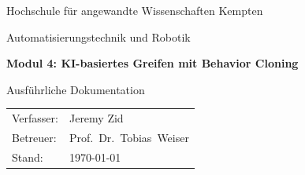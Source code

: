 \documentclass[
  a4paper,
  12pt,
  oneside,
  parskip=half,
  bibliography=totoc,
  listof=totoc,
  numbers=noenddot
]{scrreprt}
\newcommand{\doctitle}{Modul 4: KI-basiertes Greifen mit Behavior Cloning}
\newcommand{\docsubtitle}{Ausführliche Dokumentation}
\newcommand{\docauthor}{Jeremy Zid}
\newcommand{\thesiscourse}{Automatisierungstechnik und Robotik}
\newcommand{\thesissupervisor}{Prof.~Dr.~Tobias~Weiser}
\begin{document}
\begin{titlepage}
  \centering
  {\large Hochschule für angewandte Wissenschaften Kempten\par}
  \vspace{0.5cm}
  {\large \thesiscourse\par}
  \vspace{3cm}
  {\LARGE\bfseries \doctitle\par}
  \vspace{0.8cm}
  {\Large \docsubtitle\par}
  \vfill
  \begin{tabular}{ll}
    Verfasser: & \docauthor \\
    Betreuer:  & \thesissupervisor \\
    Stand:     & \today \\
  \end{tabular}
\end{titlepage}

\tableofcontents
\listoffigures
\listoftables
\printacronyms[name=Abkürzungsverzeichnis]

\cleardoublepage
{}













\printbibliography[heading=bibintoc,title=Literaturverzeichnis]

\appendix

\end{document}
